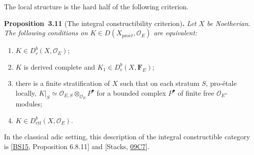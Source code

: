 \documentclass[11pt]{article}
\newenvironment{bpstatement}[2]{\par\addvspace{0.6\baselineskip}\noindent\textbf{#1}#2\textbf{.}\enspace\ignorespaces}
  {\par\addvspace{0.4\baselineskip}}
\newenvironment{bpstatementit}[2]{\begin{bpstatement}{#1}{#2}\itshape\ignorespaces}{\end{bpstatement}}
\providecommand{\Dbc}{}\renewcommand{\Dbc}{D^b_c}
\begin{document}
\label{bp225}%
The local structure is the hard half of the following criterion.

\label{bp226}%
\begin{bpstatementit}{Proposition~3.11}{ (The integral constructibility criterion)}
Let \(X\) be Noetherian. The following conditions on \(K\in D(X_{\mathrm{pro}\acute{e}t},\mathcal O_E)\) are equivalent:

\begin{enumerate}
\item \(K\in\Dbc(X,\mathcal O_E)\);
\item \(K\) is derived complete and \(K_1\in\Dbc(X,\mathbf F_E)\);
\item there is a finite stratification of \(X\) such that on each stratum \(S\), pro-étale locally, \(K|_S\simeq\mathcal O_{E,S}\otimes_{\mathcal O_E}P^\bullet\) for a bounded complex \(P^\bullet\) of finite free \(\mathcal O_E\)-modules;
\item \(K\in D^b_{\mathrm{ctf}}(X,\mathcal O_E)\).
\end{enumerate}
\end{bpstatementit}

\label{bp227}%
In the classical adic setting, this description of the integral constructible category is [\hyperref[bp705]{BS15}, Proposition 6.8.11] and [Stacks, \href{https://stacks.math.columbia.edu/tag/09C7}{09C7}].
\end{document}
